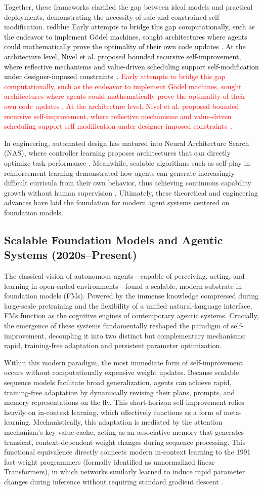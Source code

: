 \documentclass{article}
\let\oldtextcolor\textcolor
\renewcommand{\textcolor}[2]{
  \def\temp{#1}
  \def\red{blue}
  \ifx\temp\red
    \oldtextcolor{black}{#2}
  \else
    \oldtextcolor{#1}{#2}
  \fi
}
\begin{document}
Together, these frameworks clarified the gap between ideal models and practical deployments, demonstrating the  necessity of safe and constrained self-modification. \textcolor{red}{Early attempts to bridge this gap computationally, such as the endeavor to implement Gödel machines, sought architectures where agents could mathematically prove the optimality of their own code updates \citep{steunebrink2012towards}. At the architecture level, Nivel et al. proposed bounded recursive self-improvement, where reflective mechanisms and value-driven scheduling support self-modification under designer-imposed constraints~\citep{nivel2013bounded}.} 
In engineering, automated design has matured into Neural Architecture Search (NAS), where controller learning proposes architectures that can directly optimize task performance \citep{zoph2017neural}. Meanwhile, scalable algorithms such as self-play in reinforcement learning demonstrated how agents can generate increasingly difficult curricula from their own behavior, thus achieving continuous capability growth without human supervision \citep{silver2017mastering}. Ultimately, these theoretical and engineering advances have laid the foundation for modern agent systems centered on foundation models.


\subsection{Scalable Foundation Models and Agentic Systems (2020s--Present)}
The classical vision of autonomous agents---capable of perceiving, acting, and learning in open-ended environments---found a scalable, modern substrate in foundation models (FMs). Powered by the immense knowledge compressed during large-scale pretraining and the flexibility of a unified natural-language interface, FMs function as the cognitive engines of contemporary agentic systems. Crucially, the emergence of these systems fundamentally reshaped the paradigm of self-improvement, decoupling it into two distinct but complementary mechanisms: rapid, training-free adaptation and persistent parameter optimization.


Within this modern paradigm, the most immediate form of self-improvement occurs without computationally expensive weight updates. Because scalable sequence models facilitate broad generalization, agents can achieve rapid, training-free adaptation by dynamically revising their plans, prompts, and memory representations on the fly. This short-horizon self-improvement relies heavily on in-context learning, which effectively functions as a form of meta-learning. Mechanistically, this adaptation is mediated by the attention mechanism's key-value cache, acting as an associative memory that generates transient, context-dependent weight changes during sequence processing. This functional equivalence directly connects modern in-context learning to the 1991 fast-weight programmers (formally identified as unnormalized linear Transformers), in which networks similarly learned to induce rapid parameter changes during inference without requiring standard gradient descent \citep{Schmidhuber:91fastweights, schmidhuber1992learning, schmidhuber1993self, schlag2021linear}.
\end{document}
